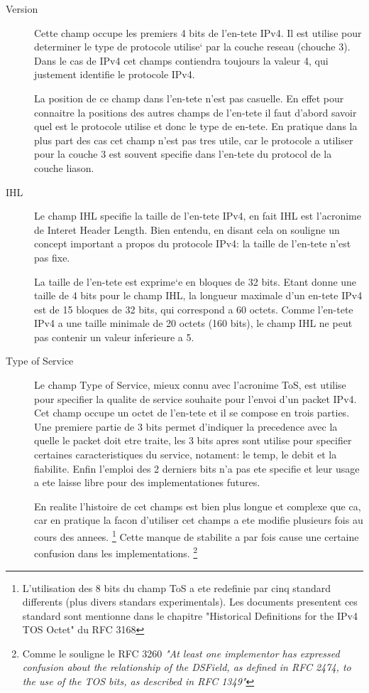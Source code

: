 \begin{description}
\item [Version] 
Cette champ occupe les premiers 4 bits de l'en-tete IPv4. Il est
utilise pour determiner le type de protocole utilise` par la couche
reseau (chouche 3). Dans le cas de IPv4 cet champs contiendra toujours
la valeur 4, qui justement identifie le protocole IPv4.

La position de ce champ dans l'en-tete n'est pas casuelle. En effet pour
connaitre la positions des autres champs de l'en-tete il faut d'abord savoir
quel est le protocole utilise et donc le type de en-tete.
En pratique dans la plus part des cas cet champ n'est pas tres utile, car le
protocole a utiliser pour la couche 3 est souvent specifie dans l'en-tete du
protocol de la couche liason.

\item [IHL]
Le champ IHL specifie la taille de l'en-tete IPv4, en fait IHL est 
l'acronime de Interet Header Length. Bien entendu, en disant cela on souligne
un concept important a propos du protocole IPv4: la taille de l'en-tete n'est pas fixe.

La taille de l'en-tete est exprime`e en bloques de 32 bits. Etant donne une taille de
4 bits pour le champ IHL, la longueur maximale d'un en-tete IPv4 est de 15 bloques de
32 bits, qui correspond a 60 octets. Comme l'en-tete IPv4 a une taille minimale
de 20 octets (160 bits), le champ IHL ne peut pas contenir un valeur inferieure a 5.

\item [Type of Service]
Le champ Type of Service, mieux connu avec l'acronime ToS, est utilise pour 
specifier la qualite de service souhaite pour l'envoi d'un packet IPv4.
Cet champ occupe un octet de l'en-tete et il se compose en trois parties.
Une premiere partie de 3 bits permet d'indiquer la precedence avec la quelle
le packet doit etre traite, les 3 bits apres sont utilise pour specifier 
certaines caracteristiques du service, notament: le temp, le debit et la fiabilite.
Enfin l'emploi des 2 derniers bits n'a pas ete specifie et leur usage a ete 
laisse libre pour des implementationes futures.


En realite l'histoire de cet champs est bien plus longue et complexe que ca,
car en pratique la facon d'utiliser cet champs a ete modifie plusieurs fois au 
cours des annees.
\footnote{L'utilisation des 8 bits du champ ToS a ete redefinie
par cinq standard differents (plus divers standars experimentals).
Les documents presentent ces standard sont mentionne dans le chapitre 
"Historical Definitions for the IPv4 TOS Octet" du RFC 3168}
Cette manque de stabilite a par fois cause une certaine confusion dans les implementations.
\footnote{Comme le souligne le RFC 3260 {\it "At least one implementor has expressed confusion about the
relationship of the DSField, as defined in RFC 2474, to the use of
the TOS bits, as described in RFC 1349"}}


\end{description}
